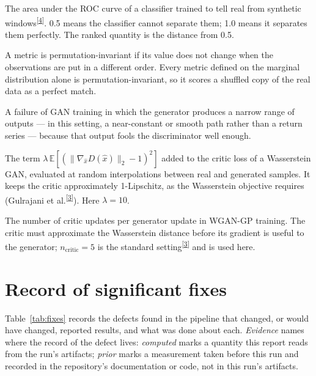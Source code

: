 \documentclass[11pt,a4paper]{article}
\makeatletter
\newcommand{\tcite}[1]{\textsuperscript{[\hyperlink{R:#1}{#1}]}}
\DeclareRobustCommand{\_}{\ifmmode\nfss@text{\textunderscore}\else\textunderscore\allowbreak\fi}
\newcommand{\E}{\mathbb{E}}
\makeatother
\begin{document}
\begin{description}[style=nextline,leftmargin=1.4em,itemsep=4pt,font=\sffamily\bfseries]
\item[Discriminative AUC] The area under the ROC curve of a classifier trained to tell real from synthetic windows\tcite{4}. 0.5 means the classifier cannot separate them; 1.0 means it separates them perfectly. The ranked quantity is the distance from 0.5.
\item[Permutation invariance] A metric is permutation-invariant if its value does not change when the observations are put in a different order. Every metric defined on the marginal distribution alone is permutation-invariant, so it scores a shuffled copy of the real data as a perfect match.
\item[Mode collapse] A failure of GAN training in which the generator produces a narrow range of outputs --- in this setting, a near-constant or smooth path rather than a return series --- because that output fools the discriminator well enough.
\item[Gradient penalty] The term $\lambda\,\E[(\|\nabla_{\hat x}D(\hat x)\|_2-1)^2]$ added to the critic loss of a Wasserstein GAN, evaluated at random interpolations between real and generated samples. It keeps the critic approximately 1-Lipschitz, as the Wasserstein objective requires (Gulrajani et al.\tcite{3}). Here $\lambda=10$.
\item[$n_\text{critic}$] The number of critic updates per generator update in WGAN-GP training. The critic must approximate the Wasserstein distance before its gradient is useful to the generator; $n_\text{critic}=5$ is the standard setting\tcite{3} and is used here.
\end{description}

\clearpage
\appendix
\renewcommand{\thesection}{\Alph{section}}

\section{Record of significant fixes}
\label{app:fixes}
Table~\ref{tab:fixes} records the defects found in the pipeline that changed, or would have changed, reported results, and what was done about each. \emph{Evidence} names where the record of the defect lives: \emph{computed} marks a quantity this report reads from the run's artifacts; \emph{prior} marks a measurement taken before this run and recorded in the repository's documentation or code, not in this run's artifacts.
\end{document}
